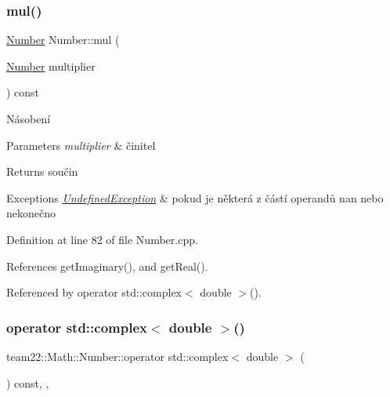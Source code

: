 \mbox{\label{classteam22_1_1_math_1_1_number_aff9d2205901de7e4ee747de05173fb7b}} 
\subsubsection{\texorpdfstring{mul()}{mul()}}
{\footnotesize\ttfamily \hyperlink{classteam22_1_1_math_1_1_number}{Number} Number\+::mul (\begin{DoxyParamCaption}\item[{\hyperlink{classteam22_1_1_math_1_1_number}{Number}}]{multiplier }\end{DoxyParamCaption}) const}



Násobení 


\begin{DoxyParams}{Parameters}
{\em multiplier} & činitel \\
\hline
\end{DoxyParams}
\begin{DoxyReturn}{Returns}
součin 
\end{DoxyReturn}

\begin{DoxyExceptions}{Exceptions}
{\em \hyperlink{classteam22_1_1_math_1_1_undefined_exception}{Undefined\+Exception}} & pokud je některá z částí operandů nan nebo nekonečno \\
\hline
\end{DoxyExceptions}


Definition at line 82 of file Number.\+cpp.



References get\+Imaginary(), and get\+Real().



Referenced by operator std\+::complex$<$ double $>$().

\mbox{\label{classteam22_1_1_math_1_1_number_a8b38859209abab3a0a31cad9547fc77c}} 
\subsubsection{\texorpdfstring{operator std\+::complex$<$ double $>$()}{operator std::complex< double >()}}
{\footnotesize\ttfamily team22\+::\+Math\+::\+Number\+::operator std\+::complex$<$ double $>$ (\begin{DoxyParamCaption}{ }\end{DoxyParamCaption}) const\hspace{0.3cm}{\ttfamily [inline]}, {\ttfamily [explicit]}, {\ttfamily [private]}}



